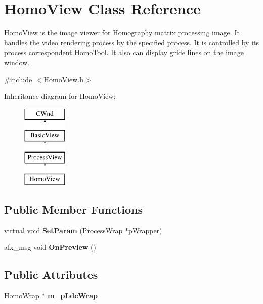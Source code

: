 \hypertarget{class_homo_view}{}\section{Homo\+View Class Reference}
\label{class_homo_view}


\mbox{\hyperlink{class_homo_view}{Homo\+View}} is the image viewer for Homography matrix processing image. It handles the video rendering process by the specified process. It is controlled by its process correspondent \mbox{\hyperlink{class_homo_tool}{Homo\+Tool}}. It also can display gride lines on the image window.  




{\ttfamily \#include $<$Homo\+View.\+h$>$}

Inheritance diagram for Homo\+View\+:\begin{figure}[H]
\begin{center}
\leavevmode
\includegraphics[height=4.000000cm]{class_homo_view}
\end{center}
\end{figure}
\subsection*{Public Member Functions}
\begin{DoxyCompactItemize}
\item 
\mbox{\label{class_homo_view_a53f404f767b1fd329d07ad28a544c51e}} 
virtual void {\bfseries Set\+Param} (\mbox{\hyperlink{class_process_wrap}{Process\+Wrap}} $\ast$p\+Wrapper)
\item 
\mbox{\label{class_homo_view_a216c8d44c93a078ef6ab750225d8fa79}} 
afx\+\_\+msg void {\bfseries On\+Preview} ()
\end{DoxyCompactItemize}
\subsection*{Public Attributes}
\begin{DoxyCompactItemize}
\item 
\mbox{\label{class_homo_view_a0eedb6c31537837e538865ce30c87645}} 
\mbox{\hyperlink{class_homo_wrap}{Homo\+Wrap}} $\ast$ {\bfseries m\+\_\+p\+Ldc\+Wrap}
\end{DoxyCompactItemize}
